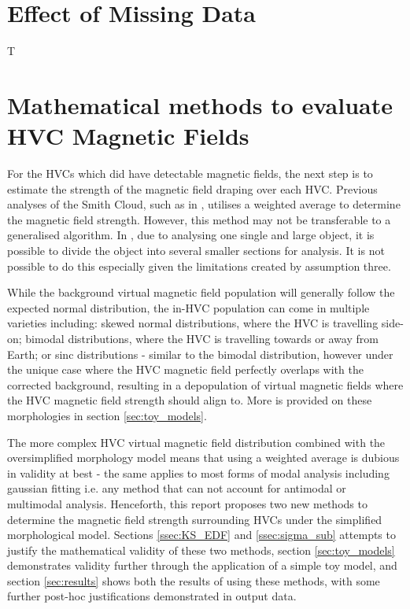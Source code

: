 \section{Effect of Missing Data}
\label{sec:Missing}

T


\section{Mathematical methods to evaluate HVC Magnetic Fields}
\label{sec:evaluation}

For the HVCs which did have detectable magnetic fields, the next step is to estimate the strength of the magnetic field draping over each HVC. Previous analyses of the Smith Cloud, such as in \cite{ID5, ID26}, utilises a weighted average to determine the magnetic field strength. However, this method may not be transferable to a generalised algorithm. In \cite{ID5, ID26}, due to analysing one single and large object, it is possible to divide the object into several smaller sections for analysis. It is not possible to do this especially given the limitations created by assumption three.


While the background virtual magnetic field population will generally follow the expected normal distribution, the in-HVC population can come in multiple varieties including: skewed normal distributions, where the HVC is travelling side-on; bimodal distributions, where the HVC is travelling towards or away from Earth; or sinc distributions - similar to the bimodal distribution, however under the unique case where the HVC magnetic field perfectly overlaps with the corrected background, resulting in a depopulation of virtual magnetic fields where the HVC magnetic field strength should align to. More is provided on these morphologies in section \ref{sec:toy_models}.


The more complex HVC virtual magnetic field distribution combined with the oversimplified morphology model means that using a weighted average is dubious in validity at best - the same applies to most forms of modal analysis including gaussian fitting i.e. any method that can not account for antimodal or multimodal analysis. Henceforth, this report proposes two new methods to determine the magnetic field strength surrounding HVCs under the simplified morphological model. Sections \ref{ssec:KS_EDF} and \ref{ssec:sigma_sub} attempts to justify the mathematical validity of these two methods, section \ref{sec:toy_models} demonstrates validity further through the application of a simple toy model, and section \ref{sec:results} shows both the results of using these methods, with some further post-hoc justifications demonstrated in output data.



